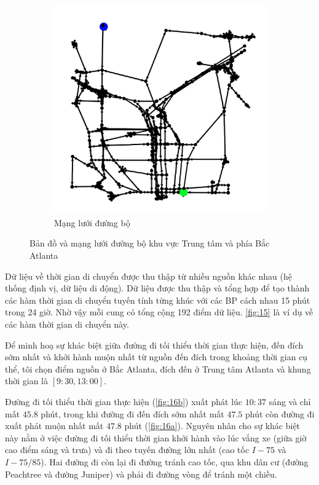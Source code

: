 \documentclass[../main.tex]{subfiles}
\begin{document}
\begin{figure}
\begin{subfigure}{0.45\textwidth}
        \includegraphics{edited-images/Figure14b.jpg}
        \caption{Mạng lưới đường bộ}
        \label{fig:14b}
    \end{subfigure}
    \caption{Bản đồ và mạng lưới đường bộ khu vực Trung tâm và phía Bắc Atlanta}
    \label{fig:14}
\end{figure}

Dữ liệu về thời gian di chuyển được thu thập từ nhiều nguồn khác nhau
(hệ thống định vị, dữ liệu di động). Dữ liệu được thu thập và tổng hợp
để tạo thành các hàm thời gian di chuyển tuyến tính từng khúc với các BP
cách nhau 15 phút trong 24 giờ. Nhờ vậy mỗi cung có tổng cộng 192 điểm
dữ liệu. \autoref{fig:15} là ví dụ về các hàm thời gian di chuyển
này.


Để minh hoạ sự khác biệt giữa đường đi tối thiểu thời gian thực hiện,
đến đích sớm nhất và khởi hành muộn nhất từ nguồn đến đích trong khoảng
thời gian cụ thể, tôi chọn điểm nguồn ở Bắc Atlanta, đích đến ở Trung
tâm Atlanta và khung thời gian là \([9:30, 13:00]\).


Đường đi tối thiểu thời gian thực
hiện (\autoref{fig:16b}) xuất phát lúc \(10:37\) sáng và chỉ mất \(45.8\) phút,
trong khi đường đi đến đích sớm nhất mất \(47.5\) phút còn đường đi xuất
phát muộn nhất mất \(47.8\) phút (\autoref{fig:16a}). Nguyên nhân cho sự khác
biệt này nằm ở việc đường đi tối thiểu thời gian khởi hành vào lúc vắng
xe (giữa giờ cao điểm sáng và trưa) và đi theo tuyến đường lớn nhất (cao
tốc \(I-75\) và \(I-75/85\)). Hai đường đi còn lại đi đường tránh cao
tốc, qua khu dân cư (đường Peachtree và đường Juniper) và phải đi đường vòng
để tránh một chiều.
\end{document}
